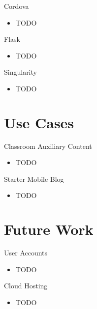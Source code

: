 \documentclass{beamer}
\begin{document}
\begin{frame}{Cordova}
    \begin{itemize}
        \item TODO
    \end{itemize}
\end{frame}

\begin{frame}{Flask}
    \begin{itemize}
        \item TODO
    \end{itemize}
\end{frame}

\begin{frame}{Singularity}
    \begin{itemize}
        \item TODO
    \end{itemize}
\end{frame}

\section{Use Cases}

\begin{frame}{Classroom Auxiliary Content}
    \begin{itemize}
        \item TODO
    \end{itemize}
\end{frame}

\begin{frame}{Starter Mobile Blog}
    \begin{itemize}
        \item TODO
    \end{itemize}
\end{frame}

\section{Future Work}

\begin{frame}{User Accounts}
    \begin{itemize}
        \item TODO
    \end{itemize}
\end{frame}

\begin{frame}{Cloud Hosting}
    \begin{itemize}
        \item TODO
    \end{itemize}
\end{frame}
\end{document}
